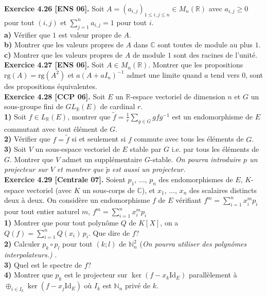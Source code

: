 \documentclass[a4paper,12pt,francais]{article}
\newcommand{\field}[1]{\mathbb{#1}}
\newcommand{\N}{\field{N}}
\newcommand{\R}{\field{R}}
\newcommand{\C}{\field{C}}
\newcommand{\id}{\mbox{Id}}
\newcommand{\rg}{\mbox{rg}}
\begin{document}
\noindent
{\bf Exercice 4.26 [ENS 06].} Soit $A=(a_{i,j})_{1\leqslant i,j \leqslant n} \in M_n(\R)$ avec $a_{i,j}\geqslant 0$ pour tout $(i,j)$ et $\displaystyle \sum_{j=1}^n  a_{i,j}=1$ pour tout $i$.\\
\indent
{\bf a)} Vérifier que $1$ est valeur propre de $A$.\\
\indent
{\bf b)} Montrer que les valeurs propres de $A$ dans $\C$ sont toutes de module au plus $1$.\\
\indent
{\bf c)} Montrer que les valeurs propres de $A$ de module $1$ sont des racines de l'unité.\\

\noindent
{\bf Exercice 4.27 [ENS 06].} Soit $A \in M_n(\R)$. Montrer que les propositions $\rg(A)=\rg(A^2)$ et $a(A+aI_n)^{-1}$ admet une limite quand $a$ tend vers $0$, sont des propositions équivalentes.\\

\noindent
{\bf Exercice 4.28 [CCP 06].} Soit $E$ un $\R$-espace vectoriel de dimension $n$ et $G$ un sous-groupe fini de $GL_\R(E)$ de cardinal $r$.\\
{\bf 1)} Soit $f \in L_\R(E)$, montrer que $\displaystyle \tilde{f}=\frac{1}{r} \sum_{g \in G} g f g^{-1}$ est un endomorphisme de $E$ commutant avec tout élément de $G$.\\
{\bf 2)} Vérifier que $f=\tilde{f}$ si et seulement si $f$ commute avec tous les éléments de $G$.\\
{\bf 3)} Soit $V$ un sous-espace vectoriel de $E$ stable par $G$ i.e. par tous les éléments de $G$. Montrer que $V$ admet un supplémentaire $G$-stable. {\it On pourra introduire $p$ un projecteur sur $V$ et montrer que $\tilde{p}$ est aussi un projecteur.}\\

\noindent
{\bf Exercice 4.29 [Centrale 07].} Soient $p_1$, $\dots$, $p_n$ des endomorphismes de $E$, $K$-espace vectoriel (avec $K$ un sous-corps de $\C$), et $x_1$, $\dots$, $x_n$ des scalaires distincts deux à deux. On considère un endomorphisme $f$ de $E$ vérifiant $\displaystyle f^m=\sum_{i=1}^n x_i^m p_i$ pour tout entier naturel $m$, 
$\displaystyle f^m=\sum_{i=1}^n x_i^m p_i$\\
\indent
{\bf 1)} Montrer que pour tout polynôme $Q$ de $K[X]$, on a $Q(f)= \displaystyle \sum_{i=1}^n Q(x_i) \, p_i$. Que dire de $f$?\\
\indent
{\bf 2)} Calculer $p_k \circ p_l$ pour tout $(k;l)$ de $\N_n^2$ ({\it On pourra utiliser des polynômes interpolateurs.)}
.\\
\indent
{\bf 3)} Quel est le spectre de $f$?\\
\indent
{\bf 4)} Montrer que $p_k$ est le projecteur sur $\ker(f-x_k \id_E)$ parallèlement à $\oplus_{i \in I_k} \ker(f-x_j \id_E)$ où $I_k$ est $\N_n$ privé de $k$.\\
\end{document}
